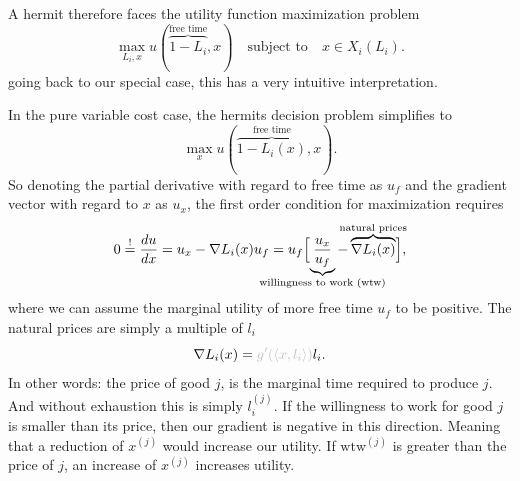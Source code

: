 A hermit therefore faces the utility function maximization problem
\[
	\max_{L_i, x} u(\overbrace{1-L_i}^{\text{free time}}, x)
	\quad\text{subject to}\quad x\in X_i(L_i).
\]
going back to our special case, this has a very intuitive interpretation.


\begin{example*}
	In the pure variable cost case, the hermits decision problem simplifies to
	\[
		\max_{x} u(\overbrace{1-L_i(x)}^{\text{free time}}, x).
	\]
	So denoting the partial derivative with regard to free time as \(u_f\) and
	the gradient vector with regard to \(x\) as \(u_x\), the first order
	condition for maximization requires
	\[
		0\overset!=\frac{du}{dx}
		= u_x - \nabla L_i(x) u_f
		= u_f \Bigl[
			\underbrace{\frac{u_x}{u_f}}_{\mathclap{\text{willingness to work (wtw)}}}
		- \overbrace{\nabla L_i(x)}^{\mathclap{\text{natural prices}}}
		\Bigr],
	\]
	where we can assume the marginal utility of more free time \(u_f\) to be
	positive. The natural prices are simply {\color{lightgray} a multiple of}
	\(l_i\)
	\[
		\nabla L_i(x) = {\color{lightgray} g'(\langle x, l_i\rangle) }l_i.
	\]
	In other words: the price of good \(j\), is the {\color{lightgray} marginal}
	time required to produce \(j\). And without exhaustion this is simply
	\(l^{(j)}_i\). If the willingness to work for good \(j\) is smaller than
	its price, then our gradient is negative in this direction. Meaning that
	a reduction of \(x^{(j)}\) would increase our utility. If \(\text{wtw}^{(j)}\) is
	greater than the price of \(j\), an increase of \(x^{(j)}\) increases utility.
\end{example*}